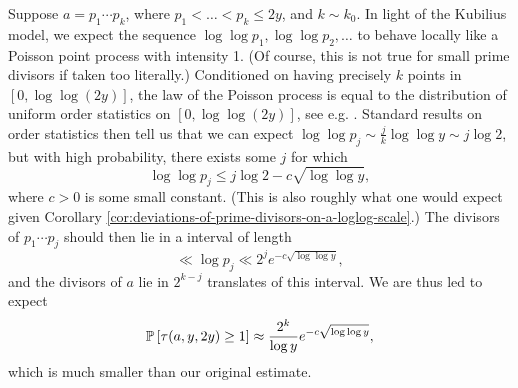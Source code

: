 Suppose $a = p_1 \cdots p_k$, where $p_1 < \dots < p_k \le 2y$, and $k \sim k_0$.
In light of the Kubilius model, we expect the sequence $\log \log p_1, \log \log p_2, \dots$ to behave locally like a Poisson point process with intensity 1. (Of course, this is not true for small prime divisors if taken too literally.) Conditioned on having precisely $k$ points in $[0, \log \log (2y)]$, the law of the Poisson process is equal to the distribution of uniform order statistics on $[0, \log \log (2y)]$, see e.g. \cite[Chapter 2.3]{ross}.
Standard results on order statistics then tell us that we can expect $\log \log p_j \sim \frac{j}{k} \log \log y \sim j \log 2$, but with high probability, there exists some $j$ for which
\begin{equation*}
    \log \log p_j \le j \log 2 - c \sqrt{\log \log y},
\end{equation*}
where $c > 0$ is some small constant. (This is also roughly what one would expect given Corollary \ref{cor:deviations-of-prime-divisors-on-a-loglog-scale}.)
The divisors of $p_1 \cdots p_j$ should then lie in a interval of length
\begin{equation*}
    \ll \log p_j \ll 2^{j} e^{-c \sqrt{\log \log y}},
\end{equation*}
and the divisors of $a$ lie in $2^{k - j}$ translates of this interval.
We are thus led to expect
\begin{equation*}
    \mathbb{P}\left[\tau(a, y, 2y) \ge 1\right] \approx \frac{2^k}{\log y} e^{-c \sqrt{\log \log y}},
\end{equation*}
which is much smaller than our original estimate.

